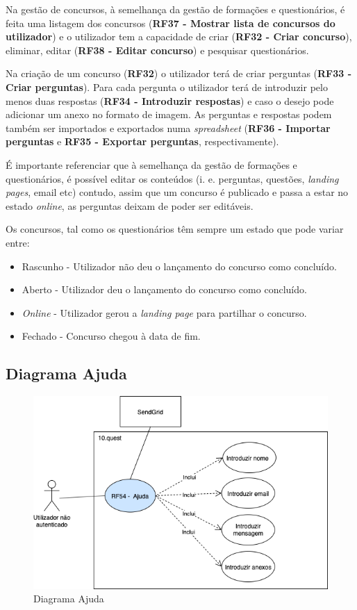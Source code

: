 Na gestão de concursos, à semelhança da gestão de formações e questionários, é feita uma listagem dos concursos (\textbf{RF37 - Mostrar lista de concursos do utilizador}) e o utilizador tem a capacidade de criar (\textbf{RF32 - Criar concurso}), eliminar, editar (\textbf{RF38 - Editar concurso}) e pesquisar questionários.

Na criação de um concurso (\textbf{RF32}) o utilizador terá de criar perguntas (\textbf{RF33 - Criar perguntas}). Para cada pergunta o utilizador terá de introduzir pelo menos duas respostas (\textbf{RF34 - Introduzir respostas}) e caso o desejo pode adicionar um anexo no formato de imagem. As perguntas e respostas podem também ser importados e exportados numa \textit{spreadsheet} (\textbf{RF36 - Importar perguntas} e \textbf{RF35 - Exportar perguntas}, respectivamente).

É importante referenciar que à semelhança da gestão de formações e questionários, é possível editar os conteúdos (i. e. perguntas, questões, \textit{landing pages}, email etc) contudo, assim que um concurso é publicado e passa a estar no estado \textit{online}, as perguntas deixam de poder ser editáveis. 

Os concursos, tal como os questionários têm sempre um estado que pode variar entre:
\begin{itemize}
	\item Rascunho - Utilizador não deu o lançamento do concurso como concluído.
	\item Aberto - Utilizador deu o lançamento do concurso como concluído.
	\item \textit{Online} - Utilizador gerou a \textit{landing page} para partilhar o concurso.
	\item Fechado - Concurso chegou à data de fim.
\end{itemize}


\subsection{Diagrama Ajuda}
\label{d:ajuda}
\begin{figure}[ht!]
	\begin{center}
		\includegraphics[width=1\textwidth]{img/rf/ajuda}
		\caption{Diagrama Ajuda}
		\label{fig:rf-ajuda}
	\end{center}
\end{figure}


